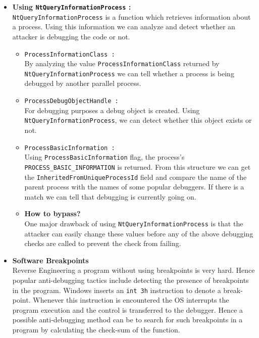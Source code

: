 \documentclass[11pt]{article}
\begin{document}
\begin{itemize}
    \item{\textbf{Using \texttt{NtQueryInformationProcess} :}\\ \texttt{NtQueryInformationProcess} is a function which retrieves information about a process. Using this information we can analyze and detect whether an attacker is debugging the code or not.

    \begin{itemize}
        \item{\texttt{ProcessInformationClass : }\\ By analyzing the value \texttt{ProcessInformationClass} returned by \\ \texttt{NtQueryInformationProcess} we can tell whether a process is being debugged by another parallel process. }
        \item{\texttt{ProcessDebugObjectHandle : }\\ For debugging purposes a debug object is created. Using \texttt{NtQueryInformationProcess}, we can detect whether this object exists or not.}
        \item{\texttt{ProcessBasicInformation : }\\ Using \texttt{ProcessBasicInformation} flag, the process's \texttt{PROCESS\_BASIC\_INFORMATION} is returned. From this structure we can get the \texttt{InheritedFromUniqueProcessId} field and compare the name of the parent process with the names of some popular debuggers. If there is a match we can tell that debugging is currently going on.}
        \item{\textbf{How to bypass?}\\ One major drawback of using \texttt{NtQueryInformationProcess} is that the attacker can easily change these values before any of the above debugging checks are called to prevent the check from failing.}
    \end{itemize}
    }
    \item{\textbf{Software Breakpoints}\\Reverse Engineering a program without using breakpoints is very hard. Hence popular anti-debugging tactics include detecting the presence of breakpoints in the program.
    Windows inserts an \texttt{int 3h} instruction to denote a break-point. Whenever this instruction is encountered the OS interrupts the program execution and the control is transferred to the debugger. Hence a possible anti-debugging method can be to search for such breakpoints in a program by calculating the check-sum of the function.}


\end{itemize}
\end{document}
